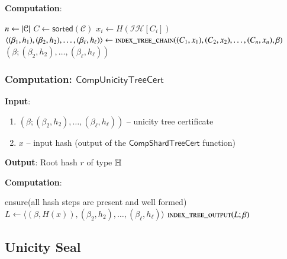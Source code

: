 \textbf{Computation}:
\begin{algorithmic}
	\State $n \gets \left|\mathcal{C}\right|$ 
	\State $C \gets \mathsf{sorted}(\mathcal{C})$ 
		\State $x_i \gets H(\mathcal{IH}[C_i])$
	\EndFor
	\State $\langle (\beta_1, h_1), (\beta_2, h_2), \ldots, (\beta_\ell, h_\ell) \rangle \gets \Call{\textsc{index\_tree\_chain}}{(C_1, x_1), (C_2, x_2), \ldots, (C_n, x_n), \beta}$ %
	\State \Return $(\beta; (\beta_2, h_2), \ldots, (\beta_\ell, h_\ell))$ 
\end{algorithmic}

\subsubsection{Computation: $\mathsf{CompUnicityTreeCert}$}
\textbf{Input}:
\begin{enumerate}
	\item $(\beta; (\beta_2, h_2), \ldots, (\beta_\ell, h_\ell))$ -- unicity tree certificate
	\item $x$ -- input hash (output of the $\mathsf{CompShardTreeCert}$ function)
\end{enumerate}
\textbf{Output}: Root hash $r$ of type $\mathbb{H}$

\textbf{Computation}:
\begin{algorithmic}[0]
	\State ensure(all hash steps are present and well formed)
	\State $L \gets \langle (\beta, H(x)), (\beta_2, h_2), \ldots, (\beta_\ell, h_\ell) \rangle$ 
	\State \Return $\Call{\textsc{index\_tree\_output}}{L; \beta}$ 
\end{algorithmic}


\subsection{Unicity Seal}

